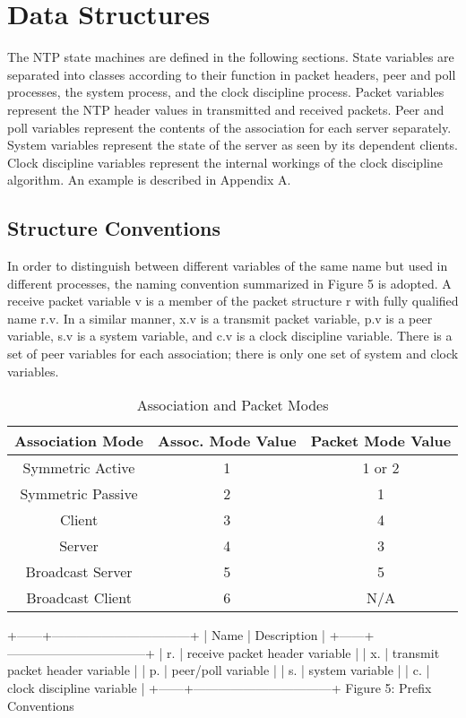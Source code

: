 \chapter{Data Structures}

The NTP state machines are defined in the following sections. State
variables are separated into classes according to their function in
packet headers, peer and poll processes, the system process, and the
clock discipline process. Packet variables represent the NTP header
values in transmitted and received packets. Peer and poll variables
represent the contents of the association for each server separately.
System variables represent the state of the server as seen by its
dependent clients. Clock discipline variables represent the internal
workings of the clock discipline algorithm. An example is described
in Appendix A.

\section{Structure Conventions}

In order to distinguish between different variables of the same name
but used in different processes, the naming convention summarized in
Figure 5 is adopted. A receive packet variable v is a member of the
packet structure r with fully qualified name r.v. In a similar
manner, x.v is a transmit packet variable, p.v is a peer variable,
s.v is a system variable, and c.v is a clock discipline variable.
There is a set of peer variables for each association; there is only
one set of system and clock variables.

\begin{table}[htb]
\center
\begin{tabular}{c | c | c}
Association Mode & Assoc. Mode Value & Packet Mode Value \\
\hline
\hline
Symmetric Active & 1 & 1 or 2 \\
Symmetric Passive & 2 & 1 \\
Client & 3 & 4 \\
Server & 4 & 3 \\
Broadcast Server & 5 & 5 \\
Broadcast Client & 6 & N/A \\
\hline
\end{tabular}
\label{association_and_packet_modes}
\caption{Association and Packet Modes}
\end{table}

+------+---------------------------------+
| Name | Description |
+------+---------------------------------+
| r. | receive packet header variable |
| x. | transmit packet header variable |
| p. | peer/poll variable |
| s. | system variable |
| c. | clock discipline variable |
+------+---------------------------------+
Figure 5: Prefix Conventions

